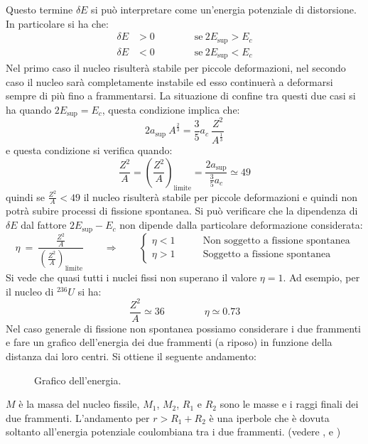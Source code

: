 Questo termine $\delta E$  si può interpretare come un'energia potenziale di
distorsione. In particolare si ha che:
\begin{equation}
\begin{split}
\delta E &> 0 \qquad \qquad \text{se}\ 2 E_\text{sup} > E_c\\
\delta E &< 0 \qquad \qquad \text{se}\ 2 E_\text{sup} < E_c
\end{split}
\end{equation}
Nel primo caso il nucleo risulterà stabile per piccole deformazioni, nel secondo
caso il nucleo sarà completamente instabile ed esso continuerà a deformarsi
sempre di più fino a frammentarsi. La situazione di confine tra questi due casi
si ha quando $2E_\text{sup} = E_c$, questa condizione implica che:
\begin{equation}
2a_\text{sup}\ A^{\frac{2}{3}}= \frac{3}{5} a_c\ \frac{Z^2}{A^{\frac{1}{3}}}
\end{equation}
e questa condizione si verifica quando:
\begin{equation}
\frac{Z^2}{A} = \left( \frac{Z^2}{A} \right)_\text{limite} = \frac{2 a_\text{sup}}{\frac{3}{5}a_c} \simeq 49
\end{equation}
quindi se $\frac{Z^2}{A} < 49$ il nucleo risulterà stabile per piccole
deformazioni e quindi non potrà subire processi di fissione spontanea. Si può
verificare che la dipendenza di $\delta E$ dal fattore $2E_\text{sup} - E_c$ non
dipende dalla particolare deformazione considerata:
\begin{equation}
\eta\ =\ \frac{\frac{Z^2}{A}}{\left( \frac{Z^2}{A} \right)_\text{limite}} \qquad \Rightarrow \qquad \begin{cases}
\eta < 1 \qquad &\text{Non soggetto a fissione spontanea}\\
\eta > 1 \qquad &\text{Soggetto a fissione spontanea}
\end{cases}
\end{equation}
Si vede che quasi tutti i nuclei fissi non superano il valore $\eta = 1$.
Ad esempio, per il nucleo di $^{236}U$ si ha:
\begin{equation}
\frac{Z^2}{A} \simeq 36 \qquad \qquad \eta \simeq 0.73
\end{equation}
Nel caso generale di fissione non spontanea possiamo considerare i due frammenti
e fare un grafico dell'energia dei due frammenti (a riposo) in funzione della
distanza dai loro centri. Si ottiene il seguente andamento:
\begin{figure}[hbtp]
\centering
\caption{Grafico dell'energia.}
\label{fig:energy}

\end{figure}
$M$ è la massa del nucleo fissile, $M_1$, $M_2$, $R_1$ e $R_2$ sono le masse e i
raggi finali dei due frammenti. L'andamento per $r > R_1 + R_2$ è una iperbole
che è dovuta soltanto all'energia potenziale coulombiana tra i due frammenti.
(vedere \pageref{allegato_3}, \pageref{allegato_41} e \pageref{allegato_42})
